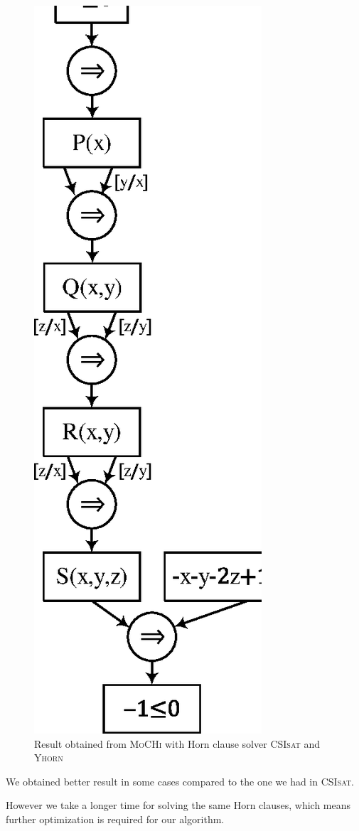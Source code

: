 \begin{figure}
\begin{center}
\quad
\includegraphics[scale=.6]{figures/unsat3.eps}
\end{center}
\caption{Result obtained from \textsc{MoCHi} with Horn clause solver \textsc{CSIsat} and
\textsc{Yhorn}}
\end{figure}

We obtained better result in some cases compared to the one we had in \textsc{CSIsat}.


However we take a longer time for solving the same Horn clauses, which
means further optimization is required for our algorithm.
